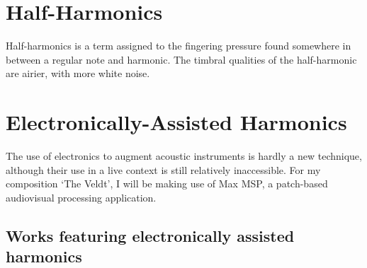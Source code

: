 \section{Half-Harmonics}
Half-harmonics is a term assigned to the fingering pressure found somewhere in between a regular note and harmonic. The timbral qualities of the half-harmonic are airier, with more white noise.

\section{Electronically-Assisted Harmonics}
The use of electronics to augment acoustic instruments is hardly a new technique, although their use in a live context is still relatively inaccessible. For my composition `The Veldt', I will be making use of Max MSP, a patch-based audiovisual processing application. 

\subsection{Works featuring electronically assisted harmonics}
\lipsum[4]
